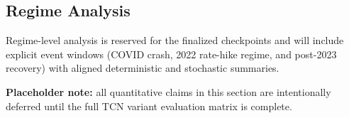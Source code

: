 \FloatBarrier

\subsection{Regime Analysis}

Regime-level analysis is reserved for the finalized checkpoints and will include explicit event windows (COVID crash, 2022 rate-hike regime, and post-2023 recovery) with aligned deterministic and stochastic summaries.

\textbf{Placeholder note:} all quantitative claims in this section are intentionally deferred until the full TCN variant evaluation matrix is complete.
